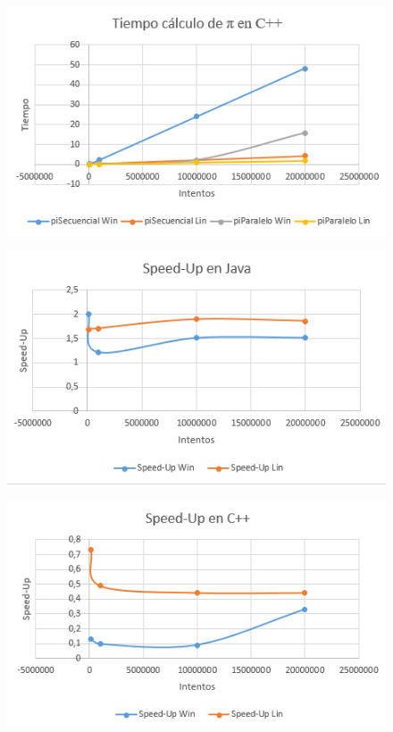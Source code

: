 \documentclass[12pt,letterpaper]{article}
\begin{document}
\begin{center}
	\begin{figure}
		\includegraphics[scale=1.3]{TiempoPiC.png}
	\end{figure}
\end{center}

\begin{center}
	\begin{figure}
		\includegraphics[scale=1.3]{SpeedUpJava.png}
	\end{figure}
\end{center}

\begin{center}
	\begin{figure}
		\includegraphics[scale=1.3]{SpeedUpC.png}
	\end{figure}
\end{center}
\end{document}
